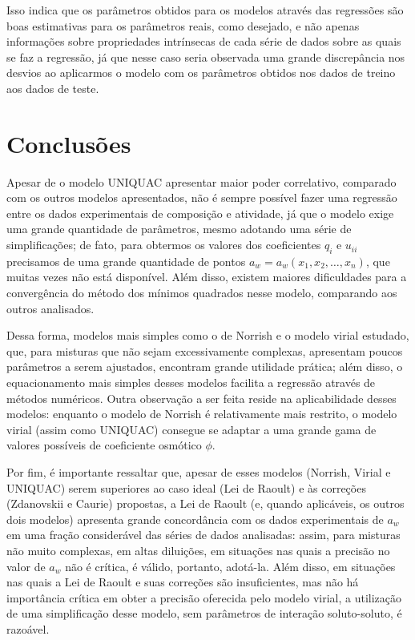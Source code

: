 \documentclass[
	12pt,				%
	openright,
	twoside,
	a4paper,			%
	english,			%
	french,				%
	brazil				%
	]{abntex2}
\begin{document}
Isso indica que os parâmetros obtidos para os modelos através das regressões são
boas estimativas para os parâmetros reais, como desejado, e não apenas informações
sobre propriedades intrínsecas de cada série de dados sobre as quais se faz a
regressão, já que nesse caso seria observada uma grande discrepância nos desvios
ao aplicarmos o modelo com os parâmetros obtidos nos dados de treino aos dados de
teste.


\part{Conclusões}

Apesar de o modelo UNIQUAC apresentar maior poder correlativo, comparado com os
outros modelos apresentados, não é sempre possível fazer uma regressão entre os
dados experimentais de composição e atividade, já que o modelo exige uma grande
quantidade de parâmetros, mesmo adotando uma série de simplificações; de fato,
para obtermos os valores dos coeficientes $q_i$ e $u_{ii}$ precisamos de uma grande
quantidade de pontos $a_w=a_w(x_1,x_2,\ldots,x_n)$, que muitas vezes não está
disponível. Além disso, existem maiores dificuldades para a convergência do método
dos mínimos quadrados nesse modelo, comparando aos outros analisados.

Dessa forma, modelos mais simples como o de Norrish e o modelo virial estudado, que,
para misturas que não sejam excessivamente complexas, apresentam poucos parâmetros
a serem ajustados, encontram grande utilidade prática; além disso, o equacionamento
mais simples desses modelos facilita a regressão através de métodos numéricos. Outra
observação a ser feita reside na aplicabilidade desses modelos: enquanto o modelo
de Norrish é relativamente mais restrito, o modelo virial (assim como UNIQUAC)
consegue se adaptar a uma grande gama de valores possíveis de coeficiente osmótico
$\phi$.

Por fim, é importante ressaltar que, apesar de esses modelos (Norrish, Virial e
UNIQUAC) serem superiores ao caso ideal (Lei de Raoult) e às correções (Zdanovskii
e Caurie) propostas, a Lei de Raoult (e, quando aplicáveis, os outros dois modelos)
apresenta grande concordância com os dados experimentais de $a_w$ em uma fração
considerável das séries de dados analisadas: assim, para misturas não muito
complexas, em altas diluições, em situações nas quais a precisão no valor
de $a_w$ não é crítica, é válido, portanto, adotá-la. Além disso, em situações
nas quais a Lei de Raoult e suas correções são insuficientes, mas não há
importância crítica em obter a precisão oferecida pelo modelo virial, a utilização
de uma simplificação desse modelo, sem parâmetros de interação soluto-soluto, é
razoável.
\end{document}
